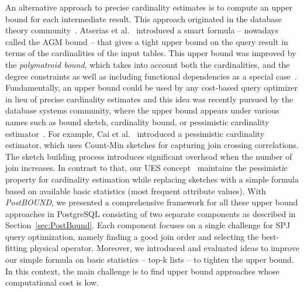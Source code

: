 An alternative approach to precise cardinality estimates is to compute an upper bound for each intermediate result. 
This approach originated in the database theory community~\cite{DBLP:conf/soda/GroheM06}.
Atserias et al.~\cite{DBLP:conf/focs/AtseriasGM08} introduced a smart formula -- nowadays called the AGM bound -- that gives a tight upper bound on the query result in terms of the cardinalities of the input tables. 
This upper bound was improved by the \emph{polymatroid bound}, which takes into account both the cardinalities, and the degree constraints as well as including functional dependencies as a special case~\cite{DBLP:journals/jacm/GottlobLVV12,DBLP:conf/pods/KhamisNS16,DBLP:conf/pods/000118}.
Fundamentally, an upper bound could be used by any cost-based query optimizer in lieu of precise cardinality estimates and this idea was recently pursued by the database systems community, where the upper bound appears under various names such as bound sketch, cardinality bound, or pessimistic cardinality estimator~\cite{DBLP:conf/sigmod/CaiBS19,DBLP:journals/corr/abs-2201-04166,hertzschuch-21-ues}. 
For example, Cai et al.~\cite{DBLP:conf/sigmod/CaiBS19} introduced a pessimistic cardinality estimator, which uses Count-Min sketches for capturing join crossing correlations. 
The sketch building process introduces significant overhead when the number of join increases.
In contrast to that, our UES concept~\cite{hertzschuch-21-ues} maintains the pessimistic property for cardinality estimation while replacing sketches with a simple formula based on available basic statistics (most frequent attribute values). 
With \emph{PostBOUND}, we presented a comprehensive framework for all these upper bound approaches in PostgreSQL consisting of two separate components as described in Section~\ref{sec:PostBound}.
Each component focuses on a single challenge for SPJ query optimization, namely finding a good join order and selecting the best-fitting physical operator.
Moreover, we introduced and evaluated ideas to improve our simple formula on basic statistics -- top-k lists -- to tighten the upper bound.
In this context, the main challenge is to find upper bound approaches whose computational cost is low. 
